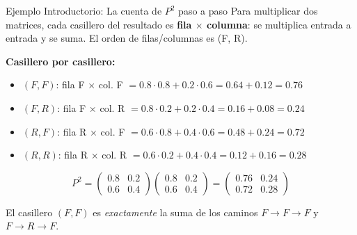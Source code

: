 \documentclass{beamer}
\begin{document}
\begin{frame}{Ejemplo Introductorio: La cuenta de $P^2$ paso a paso}
    \small
    Para multiplicar dos matrices, cada casillero del resultado es \textbf{fila $\times$ columna}: se multiplica entrada a entrada y se suma. El orden de filas/columnas es (F, R).

    \vspace{0.5em}

    \textbf{Casillero por casillero:}
    \begin{itemize}
        \item $(F,F)$: fila F $\times$ col. F $= 0.8 \cdot 0.8 + 0.2 \cdot 0.6 = 0.64 + 0.12 = \mathbf{0.76}$
        \item $(F,R)$: fila F $\times$ col. R $= 0.8 \cdot 0.2 + 0.2 \cdot 0.4 = 0.16 + 0.08 = 0.24$
        \item $(R,F)$: fila R $\times$ col. F $= 0.6 \cdot 0.8 + 0.4 \cdot 0.6 = 0.48 + 0.24 = 0.72$
        \item $(R,R)$: fila R $\times$ col. R $= 0.6 \cdot 0.2 + 0.4 \cdot 0.4 = 0.12 + 0.16 = 0.28$
    \end{itemize}

    \vspace{0.3em}

    \[P^2 = \begin{pmatrix}
    0.8 & 0.2 \\
    0.6 & 0.4
    \end{pmatrix} \begin{pmatrix}
    0.8 & 0.2 \\
    0.6 & 0.4
    \end{pmatrix} = \begin{pmatrix}
    \mathbf{0.76} & 0.24 \\
    0.72 & 0.28
    \end{pmatrix}\]

    \vspace{0.2em}

    El casillero $(F,F)$ es \emph{exactamente} la suma de los caminos $F\to F\to F$ y $F\to R\to F$.
\end{frame}

\end{document}
